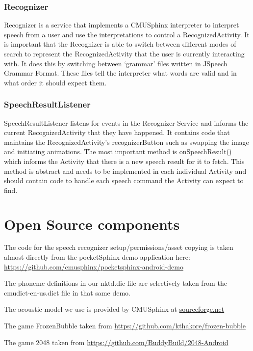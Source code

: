 \documentclass[11pt, oneside]{article}
\begin{document}
\subsubsection{Recognizer}
Recognizer is a service that implements a CMUSphinx interpreter to
interpret speech from a user and use the interpretations to control a
RecognizedActivity. It is important that the Recognizer is able to
switch between different modes of search to represent the
RecognizedActivity that the user is currently interacting with. It
does this by switching between `grammar' files written in JSpeech
Grammar Format. These files tell the interpreter what words are valid
and in what order it should expect them.

\subsubsection{SpeechResultListener}
SpeechResultListener listens for events in the Recognizer Service and
informs the current RecognizedActivity that they have happened. It
contains code that maintains the RecognizedActivity's recognizerButton
such as swapping the image and initiating animations. The most
important method is onSpeechResult() which informs the Activity that
there is a new speech result for it to fetch. This method is abstract
and needs to be implemented in each individual Activity and should
contain code to handle each speech command the Activity can expect to
find.

\section{Open Source components}

The code for the speech recognizer setup/permissions/asset copying is
taken almost directly from the pocketSphinx demo application here:
\url{https://github.com/cmusphinx/pocketsphinx-android-demo}

The phoneme definitions in our nktd.dic file are selectively taken
from the cmudict-en-us.dict file in that same demo.

The acoustic model we use is provided by CMUSphinx at
\href{https://sourceforge.net/projects/cmusphinx/files/Acoustic\%20and\%20Language\%20Models/US\%20English/}{sourceforge.net}

The game FrozenBubble taken from
\url{https://github.com/kthakore/frozen-bubble}

The game 2048 taken from
\url{https://github.com/BuddyBuild/2048-Android}
    
\end{document}
